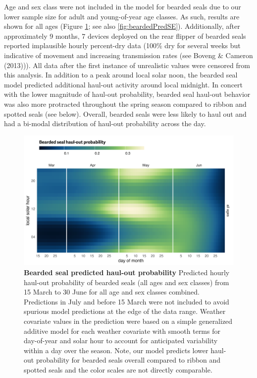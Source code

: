 \documentclass[fleqn,10pt,lineno]{wlpeerj} %
\begin{document}
Age and sex class were not included in the model for bearded seals due to our
lower sample size for adult and young-of-year age classes. As such, results are
shown for all ages (Figure \ref{fig:beardedHOCal}; see also
\ref{fig:beardedPredSE}). Additionally, after approximately 9 months, 7 devices
deployed on the rear flipper of bearded seals reported implausible hourly
percent-dry data (100\% dry for several weeks but indicative of movement and
increasing transmission rates (see Boveng \& Cameron (2013))). All data after the first
instance of unrealistic values were censored from this analysis. In addition to
a peak around local solar noon, the bearded seal model predicted additional
haul-out activity around local midnight. In concert with the lower magnitude of
haul-out probability, bearded seal haul-out behavior was also more protracted
throughout the spring season compared to ribbon
and spotted seals (see below). Overall, bearded seals were
less likely to haul out and had a bi-modal distribution of haul-out probability
across the day.



\begin{figure}
\includegraphics[width=1\linewidth]{../figures/Figure-005} \caption{\textbf{Bearded seal predicted haul-out probability} \linebreak Predicted hourly haul-out probability of bearded seals (all ages and sex classes) from 15 March to 30 June for all age and sex classes combined. Predictions in July and before 15 March were not included to avoid spurious model predictions at the edge of the data range. Weather covariate values in the prediction were based on a simple generalized additive model for each weather covariate with smooth terms for day-of-year and solar hour to account for anticipated variability within a day over the season. Note, our model predicts lower haul-out probability for bearded seals overall compared to ribbon and spotted seals and the color scales are not directly comparable.}\label{fig:beardedHOCal}
\end{figure}
\end{document}
